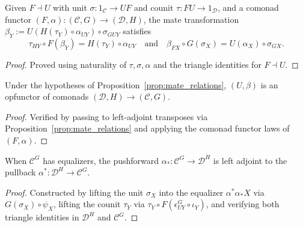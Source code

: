 \begin{proposition}
  \label{prop:mate_relations}
  \leanok
  Given $F \dashv U$ with unit $\sigma : 1_{\mathcal{C}} \to UF$ and counit $\tau : FU \to 1_{\mathcal{D}}$, and a comonad functor $(F, \alpha) : (\mathcal{C}, G) \to (\mathcal{D}, H)$, the mate transformation $\beta_Y := U(H(\tau_Y) \circ \alpha_{UY}) \circ \sigma_{GUY}$ satisfies
  \[
    \tau_{HY} \circ F(\beta_Y) = H(\tau_Y) \circ \alpha_{UY} \quad\text{and}\quad \beta_{FX} \circ G(\sigma_X) = U(\alpha_X) \circ \sigma_{GX}.
  \]
\end{proposition}
\begin{proof}
  \leanok
  Proved using naturality of $\tau, \sigma, \alpha$ and the triangle identities for $F \dashv U$.
\end{proof}

\begin{proposition}
  \label{prop:mate_opfunctor}
  \leanok
  Under the hypotheses of Proposition~\ref{prop:mate_relations}, $(U, \beta)$ is an opfunctor of comonads $(\mathcal{D}, H) \to (\mathcal{C}, G)$.
\end{proposition}
\begin{proof}
  \leanok
  Verified by passing to left-adjoint transposes via Proposition~\ref{prop:mate_relations} and applying the comonad functor laws of $(F, \alpha)$.
\end{proof}

\begin{proposition}
  \label{prop:lifted_adjunction}
  \leanok
  When $\mathcal{C}^G$ has equalizers, the pushforward $\alpha_* : \mathcal{C}^G \to \mathcal{D}^H$ is left adjoint to the pullback $\alpha^* : \mathcal{D}^H \to \mathcal{C}^G$.
\end{proposition}
\begin{proof}
  \leanok
  Constructed by lifting the unit $\sigma_X$ into the equalizer $\alpha^*\alpha_* X$ via $G(\sigma_X) \circ \psi_X$, lifting the counit $\tau_Y$ via $\tau_Y \circ F(\epsilon^G_{UY} \circ \iota_Y)$, and verifying both triangle identities in $\mathcal{D}^H$ and $\mathcal{C}^G$.
\end{proof}

